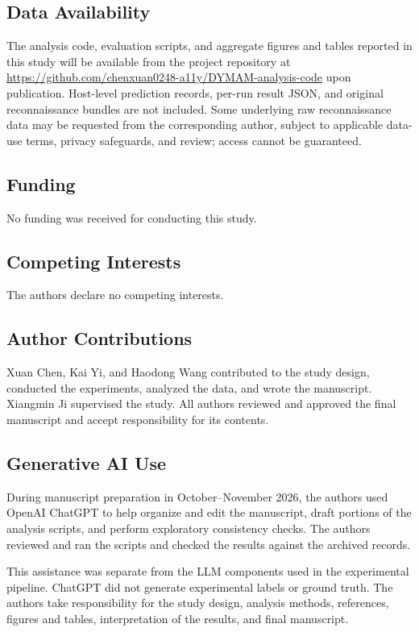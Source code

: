 \documentclass[sn-basic]{sn-jnl}%
\theoremstyle{thmstyleone}%
\theoremstyle{thmstyletwo}%
\theoremstyle{thmstylethree}%
\begin{document}
\subsection*{Data Availability}

The analysis code, evaluation scripts, and aggregate figures and tables reported in this study will be available from the project repository at \url{https://github.com/chenxuan0248-a11y/DYMAM-analysis-code} upon publication. Host-level prediction records, per-run result JSON, and original reconnaissance bundles are not included. Some underlying raw reconnaissance data may be requested from the corresponding author, subject to applicable data-use terms, privacy safeguards, and review; access cannot be guaranteed.

\subsection*{Funding}

No funding was received for conducting this study.

\subsection*{Competing Interests}

The authors declare no competing interests.

\subsection*{Author Contributions}

Xuan Chen, Kai Yi, and Haodong Wang contributed to the study design, conducted the experiments, analyzed the data, and wrote the manuscript. Xiangmin Ji supervised the study. All authors reviewed and approved the final manuscript and accept responsibility for its contents.

\subsection*{Generative AI Use}

During manuscript preparation in October--November 2026, the authors used OpenAI ChatGPT to help organize and edit the manuscript, draft portions of the analysis scripts, and perform exploratory consistency checks. The authors reviewed and ran the scripts and checked the results against the archived records.

This assistance was separate from the LLM components used in the experimental pipeline. ChatGPT did not generate experimental labels or ground truth. The authors take responsibility for the study design, analysis methods, references, figures and tables, interpretation of the results, and final manuscript.
\end{document}
